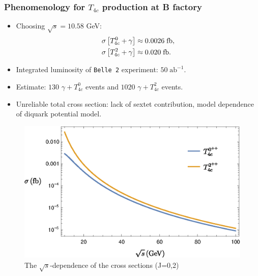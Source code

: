 \begin{frame}
  \frametitle{Phenomenology for $T_{4c}$ production at B factory}

  \begin{minipage}{0.35\textwidth}
	  \begin{itemize}
		\item Choosing $\sqrt{s}=10.58$ GeV: 
		\begin{align*}
			\sigma\left[T_{4c}^0+\gamma \right]  & \approx  0.0026\;{\rm fb},
			\\
			\sigma\left[T_{4c}^2+\gamma  \right] & \approx  0.020\;{\rm fb}.
		  \end{align*}
		  \item Integrated luminosity of {\tt Belle 2} experiment: $50\;\mathrm{ab}^{-1}$.\vfill
		  \item Estimate: $130$
		  $\gamma+T_{4c}^0$ events and $1020$ $\gamma+T_{4c}^2$ events.\vfill
		  \item Unreliable total cross section: lack of sextet contribution, model dependence of diquark potential model. 
	  \end{itemize}
  \end{minipage}\hfill
  \begin{minipage}{0.6\textwidth}
	  \begin{figure}[!hbtp]
	      \centering
	      \includegraphics[width=\textwidth]{UnpolarizedCrossSection.eps}
	      \caption{The $\sqrt{s}$-dependence of the cross sections (J=0,2)}
	      \label{fig:upcs}
	    \end{figure}
	    \begin{figure}[!hbtp]

\end{figure}
\end{minipage}
\end{frame}
